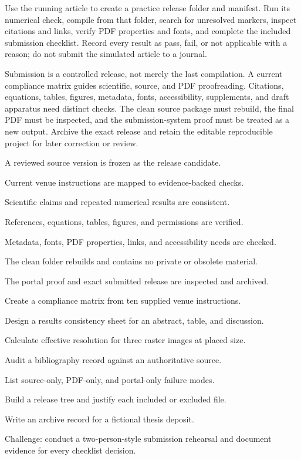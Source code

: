 \begin{miniproject}
Use the running article to create a practice release folder and manifest. Run
its numerical check, compile from that folder, search for unresolved markers,
inspect citations and links, verify PDF properties and fonts, and complete the
included submission checklist. Record every result as pass, fail, or not
applicable with a reason; do not submit the simulated article to a journal.
\end{miniproject}

\chaptersummary

Submission is a controlled release, not merely the last compilation. A current
compliance matrix guides scientific, source, and PDF proofreading. Citations,
equations, tables, figures, metadata, fonts, accessibility, supplements, and
draft apparatus need distinct checks. The clean source package must rebuild,
the final PDF must be inspected, and the submission-system proof must be treated
as a new output. Archive the exact release and retain the editable reproducible
project for later correction or review.

\chaptercheck
\begin{chapterchecklist}
  \item A reviewed source version is frozen as the release candidate.
  \item Current venue instructions are mapped to evidence-backed checks.
  \item Scientific claims and repeated numerical results are consistent.
  \item References, equations, tables, figures, and permissions are verified.
  \item Metadata, fonts, PDF properties, links, and accessibility needs are checked.
  \item The clean folder rebuilds and contains no private or obsolete material.
  \item The portal proof and exact submitted release are inspected and archived.
\end{chapterchecklist}

\chapterexercisestitle
\begin{chapterexercises}
  \item Create a compliance matrix from ten supplied venue instructions.
  \item Design a results consistency sheet for an abstract, table, and discussion.
  \item Calculate effective resolution for three raster images at placed size.
  \item Audit a bibliography record against an authoritative source.
  \item List source-only, PDF-only, and portal-only failure modes.
  \item Build a release tree and justify each included or excluded file.
  \item Write an archive record for a fictional thesis deposit.
  \item Challenge: conduct a two-person-style submission rehearsal and document
        evidence for every checklist decision.
\end{chapterexercises}

